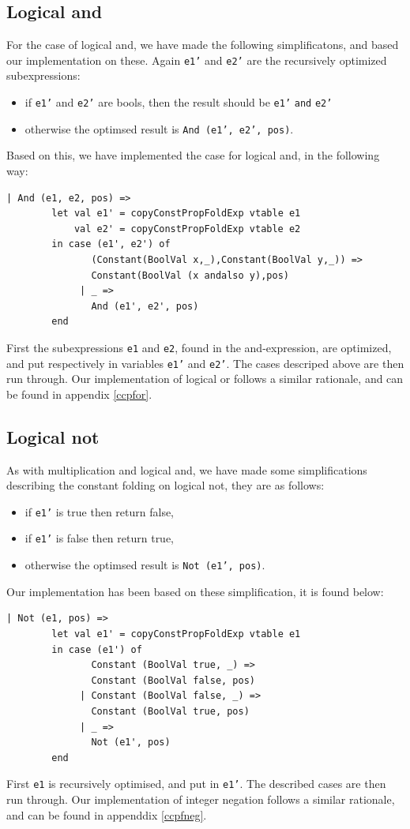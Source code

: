 \documentclass[11pt]{article}
\begin{document}
	\subsection{Logical and}
	For the case of logical and, we have made the following simplificatons, and based our implementation
	on these. Again \texttt{e1'} and \texttt{e2'} are the recursively optimized subexpressions:
	\begin{itemize}
	\item if \texttt{e1'} and \texttt{e2'} are bools, then the result should be
	\texttt{e1'} \texttt{and} \texttt{e2'}
	\item otherwise the optimsed result is  \texttt{And (e1', e2', pos)}.
	\end{itemize}
	Based on this, we have implemented the case for logical and, in the following way:
	\begin{lstlisting}[basicstyle=\small]
      | And (e1, e2, pos) =>
        let val e1' = copyConstPropFoldExp vtable e1
            val e2' = copyConstPropFoldExp vtable e2
        in case (e1', e2') of
               (Constant(BoolVal x,_),Constant(BoolVal y,_)) =>
               Constant(BoolVal (x andalso y),pos)
             | _ =>
               And (e1', e2', pos)
        end
	\end{lstlisting}
	First the subexpressions \texttt{e1} and \texttt{e2}, found in the and-expression, are
	optimized, and put respectively in variables \texttt{e1'} and \texttt{e2'}. The cases descriped above
	are then run through. Our implementation of logical or follows a similar rationale, and can be found in
	appendix \ref{ccpfor}.
	\subsection{Logical not}
	As with multiplication and logical and, we have made some simplifications describing the
	constant folding on logical not, they are as follows:
	\begin{itemize}
	\item if \texttt{e1'} is true then return false,
	\item if \texttt{e1'} is false then return true,
	\item otherwise the optimsed result is  \texttt{Not (e1', pos)}.
	\end{itemize}
	Our implementation has been based on these simplification, it is found below:
	\begin{lstlisting}[basicstyle=\small]
      | Not (e1, pos) =>
        let val e1' = copyConstPropFoldExp vtable e1
        in case (e1') of
               Constant (BoolVal true, _) =>
               Constant (BoolVal false, pos)
             | Constant (BoolVal false, _) =>
               Constant (BoolVal true, pos)
             | _ =>
               Not (e1', pos)
        end
	\end{lstlisting}
	First \texttt{e1} is recursively optimised, and put in \texttt{e1'}. The described cases are
	then run through. Our implementation of integer negation follows a similar rationale, and can
	be found in appenddix \ref{ccpfneg}.
\end{document}

